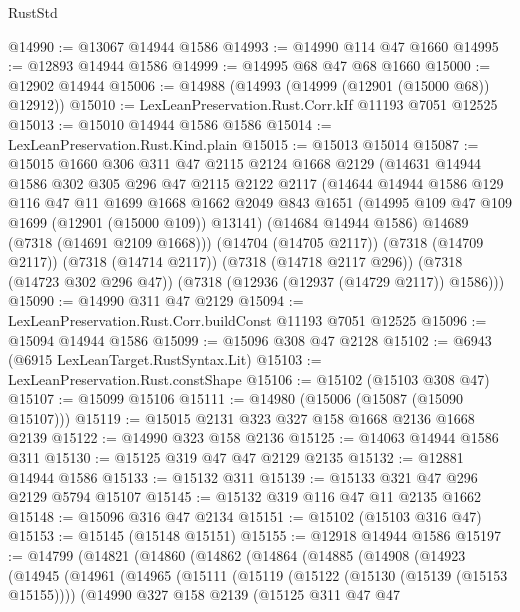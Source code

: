 \begin{lexlean}{RustStd}
\begin{coremodule}
@14990 := @13067 @14944 @1586
@14993 := @14990 @114 @47 @1660
@14995 := @12893 @14944 @1586
@14999 := @14995 @68 @47 @68 @1660
@15000 := @12902 @14944
@15006 := @14988 (@14993 (@14999 (@12901 (@15000 @68)) @12912))
@15010 := LexLeanPreservation.Rust.Corr.kIf @11193 @7051 @12525
@15013 := @15010 @14944 @1586 @1586
@15014 := LexLeanPreservation.Rust.Kind.plain
@15015 := @15013 @15014
@15087 := @15015
    @1660
    @306
    @311
    @47
    @2115
    @2124
    @1668
    @2129
    (@14631
      @14944
      @1586
      @302
      @305
      @296
      @47
      @2115
      @2122
      @2117
      (@14644
        @14944
        @1586
        @129
        @116
        @47
        @11
        @1699
        @1668
        @1662
        @2049
        @843
        @1651
        (@14995 @109 @47 @109 @1699 (@12901 (@15000 @109)) @13141)
        (@14684 @14944 @1586)
        @14689
        (@7318 (@14691 @2109 @1668)))
      (@14704 (@14705 @2117))
      (@7318 (@14709 @2117))
      (@7318 (@14714 @2117))
      (@7318 (@14718 @2117 @296))
      (@7318 (@14723 @302 @296 @47))
      (@7318 (@12936 (@12937 (@14729 @2117)) @1586)))
@15090 := @14990 @311 @47 @2129
@15094 := LexLeanPreservation.Rust.Corr.buildConst @11193 @7051 @12525
@15096 := @15094 @14944 @1586
@15099 := @15096 @308 @47 @2128
@15102 := @6943 (@6915 LexLeanTarget.RustSyntax.Lit)
@15103 := LexLeanPreservation.Rust.constShape
@15106 := @15102 (@15103 @308 @47)
@15107 := @15099 @15106
@15111 := @14980 (@15006 (@15087 (@15090 @15107)))
@15119 := @15015 @2131 @323 @327 @158 @1668 @2136 @1668 @2139
@15122 := @14990 @323 @158 @2136
@15125 := @14063 @14944 @1586 @311
@15130 := @15125 @319 @47 @47 @2129 @2135
@15132 := @12881 @14944 @1586
@15133 := @15132 @311
@15139 := @15133 @321 @47 @296 @2129 @5794 @15107
@15145 := @15132 @319 @116 @47 @11 @2135 @1662
@15148 := @15096 @316 @47 @2134
@15151 := @15102 (@15103 @316 @47)
@15153 := @15145 (@15148 @15151)
@15155 := @12918 @14944 @1586
@15197 := @14799
    (@14821
      (@14860
        (@14862
          (@14864
            (@14885
              (@14908
                (@14923
                  (@14945
                    (@14961
                      (@14965
                        (@15111
                          (@15119
                            (@15122 (@15130 (@15139 (@15153 @15155))))
                            (@14990
                              @327
                              @158
                              @2139
                              (@15125
                                @311
                                @47
                                @47

\end{coremodule}
\end{lexlean}

